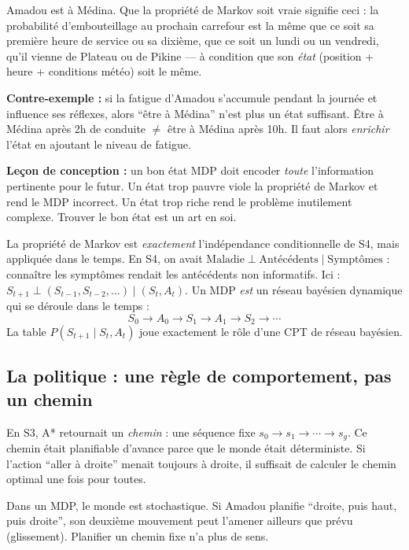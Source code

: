\documentclass[11pt,a4paper]{article}
\begin{document}
\begin{exemplebox}
Amadou est à Médina. Que la propriété de Markov soit vraie signifie ceci : la probabilité d'embouteillage au prochain carrefour est la même que ce soit sa première heure de service ou sa dixième, que ce soit un lundi ou un vendredi, qu'il vienne de Plateau ou de Pikine --- à condition que son \textit{état} (position + heure + conditions météo) soit le même.

\textbf{Contre-exemple :} si la fatigue d'Amadou s'accumule pendant la journée et influence ses réflexes, alors ``être à Médina'' n'est plus un état suffisant. Être à Médina après 2h de conduite $\neq$ être à Médina après 10h. Il faut alors \textit{enrichir} l'état en ajoutant le niveau de fatigue.

\textbf{Leçon de conception :} un bon état MDP doit encoder \textit{toute} l'information pertinente pour le futur. Un état trop pauvre viole la propriété de Markov et rend le MDP incorrect. Un état trop riche rend le problème inutilement complexe. Trouver le bon état est un art en soi.
\end{exemplebox}

\begin{attentionbox}
La propriété de Markov est \textit{exactement} l'indépendance conditionnelle de S4, mais appliquée dans le temps. En S4, on avait $\text{Maladie} \perp \text{Antécédents} \mid \text{Symptômes}$ : connaître les symptômes rendait les antécédents non informatifs. Ici : $S_{t+1} \perp (S_{t-1}, S_{t-2}, \ldots) \mid (S_t, A_t)$. Un MDP \textit{est} un réseau bayésien dynamique qui se déroule dans le temps :
$$S_0 \to A_0 \to S_1 \to A_1 \to S_2 \to \cdots$$
La table $P(S_{t+1} \mid S_t, A_t)$ joue exactement le rôle d'une CPT de réseau bayésien.
\end{attentionbox}

\subsection{La politique : une règle de comportement, pas un chemin}

En S3, A* retournait un \textit{chemin} : une séquence fixe $s_0 \to s_1 \to \cdots \to s_g$. Ce chemin était planifiable d'avance parce que le monde était déterministe. Si l'action ``aller à droite'' menait toujours à droite, il suffisait de calculer le chemin optimal une fois pour toutes.

Dans un MDP, le monde est stochastique. Si Amadou planifie ``droite, puis haut, puis droite'', son deuxième mouvement peut l'amener ailleurs que prévu (glissement). Planifier un chemin fixe n'a plus de sens.
\end{document}
